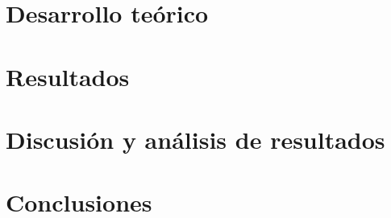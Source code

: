 \documentclass[10pt, letterpaper]{report}
\newcommand{\defaultparformat}[1]{
	{\setlength{\parskip}{2ex}
    }
}
\begin{document}
%     	

\ifdefined\CAPantecedentes
	\newpage
	\chapter{Desarrollo teórico}
	\ifdefined\parpordefecto
    	\defaultparformat{teoria}
    \else
    	
    \fi  
\fi

\newpage
\ifdefined\parpordefecto
	\defaultparformat{capitulos}
\else
	
\fi

\ifdefined\CAPantecedentes
	\newpage
	\chapter{Resultados}
	\ifdefined\parpordefecto
    	\defaultparformat{resultados}
    \else
    	
    \fi  
\fi

\ifdefined\CAPantecedentes
	\newpage
	\chapter{Discusión y análisis de resultados}
	\ifdefined\parpordefecto
    	\defaultparformat{discusion}
    \else
    	
    \fi  
\fi

\ifdefined\CAPconclusiones
	\newpage
	\chapter{Conclusiones}
	\ifdefined\parpordefecto
		\defaultparformat{conclusiones}
	\else
		
	\fi
\fi

\ifdefined\CAPrecomendaciones
	\newpage
\end{document}
